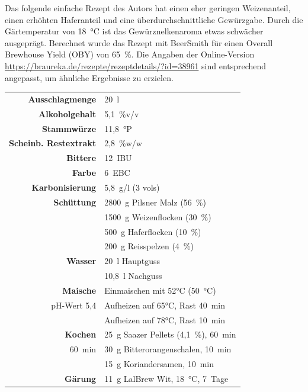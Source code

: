 \documentclass[a4paper,parskip=half]{scrartcl}
\begin{document}
Das folgende einfache Rezept des Autors hat einen eher geringen Weizenanteil,
einen erhöhten Haferanteil und eine überdurchschnittliche Gewürzgabe.
Durch die Gärtemperatur von 18~°C ist das Gewürznelkenaroma etwas schwächer
ausgeprägt. Berechnet wurde das Rezept mit BeerSmith für einen Overall
Brewhouse Yield (OBY) von 65~\%. Die Angaben der Online-Version \url{https://braureka.de/rezepte/rezeptdetails/?id=38961} sind entsprechend
angepasst, um ähnliche Ergebnisse zu erzielen.

\begin{table}[H]
\centering
\begin{tabular}{rl}
\toprule
\textbf{Ausschlagmenge} & 20~l \\
\textbf{Alkoholgehalt} & 5,1~\%v/v \\
\textbf{Stammwürze} & 11,8~°P \\
\textbf{Scheinb. Restextrakt} & 2,8~\%w/w \\
\textbf{Bittere} & 12~IBU \\
\textbf{Farbe} & 6~EBC \\
\textbf{Karbonisierung} & 5,8~g/l (3 vols) \\
\midrule
\textbf{Schüttung} & 2800~g Pilsner Malz (56~\%) \\
 & 1500~g Weizenflocken (30~\%) \\
 & 500~g Haferflocken (10~\%) \\ 
 & 200~g Reisspelzen (4~\%) \\
\midrule
\textbf{Wasser} & 20~l Hauptguss \\
 & 10,8~l Nachguss \\
\midrule
\textbf{Maische} & Einmaischen mit 52°C (50~°C) \\
pH-Wert 5,4 & Aufheizen auf 65°C, Rast 40~min \\
 & Aufheizen auf 78°C, Rast 10~min \\
\midrule
\textbf{Kochen} & 25~g Saazer Pellets (4,1~\%), 60~min \\
60~min & 30~g Bitterorangenschalen, 10~min \\
 & 15~g Koriandersamen, 10~min \\
\midrule
\textbf{Gärung} & 11~g LalBrew Wit, 18~°C, 7~Tage \\
\bottomrule
\end{tabular}
\end{table}

\printbibliography[title=Quellen]
\end{document}
